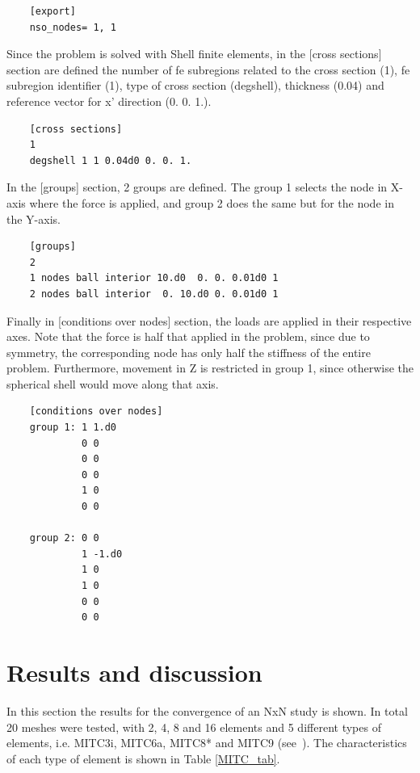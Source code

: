 \documentclass[11pt]{article}
\begin{document}
	\begin{verbatim}
	[export]
	nso_nodes= 1, 1
	\end{verbatim}
	
	Since the problem is solved with Shell finite elements, in the [cross sections] section are defined the number of fe subregions related to the cross section (1), fe subregion identifier (1), type of cross section (degshell), thickness (0.04) and reference vector for x' direction (0. 0. 1.).
	
	\begin{verbatim}
	[cross sections]
	1
	degshell 1 1 0.04d0 0. 0. 1.
	\end{verbatim}
	
	In the [groups] section, 2 groups are defined. The group 1 selects the node in X-axis where the force is applied, and group 2 does the same but for the node in the Y-axis.
	
	\begin{verbatim}
	[groups]
	2
	1 nodes ball interior 10.d0  0. 0. 0.01d0 1
	2 nodes ball interior  0. 10.d0 0. 0.01d0 1
	\end{verbatim}
	
	Finally in [conditions over nodes] section, the loads are applied in their respective axes. Note that the force is half that applied in the problem, since due to symmetry, the corresponding node has only half the stiffness of the entire problem. Furthermore, movement in Z is restricted in group 1, since otherwise the spherical shell would move along that axis.
	
	\begin{verbatim}
	[conditions over nodes]
	group 1: 1 1.d0
	         0 0
	         0 0
	         0 0
	         1 0
	         0 0

	group 2: 0 0
	         1 -1.d0
	         1 0
	         1 0
	         0 0
	         0 0
	\end{verbatim}

	\section*{Results and discussion}
	
	In this section the results for the convergence of an NxN study is shown. In total 20 meshes were tested, with 2, 4, 8 and 16 elements and 5 different types of elements, i.e. MITC3i, MITC6a, MITC8* and MITC9 (see~\cite{Bathe2006}). The characteristics of each type of element is shown in Table \ref{MITC_tab}.
	
\end{document}
